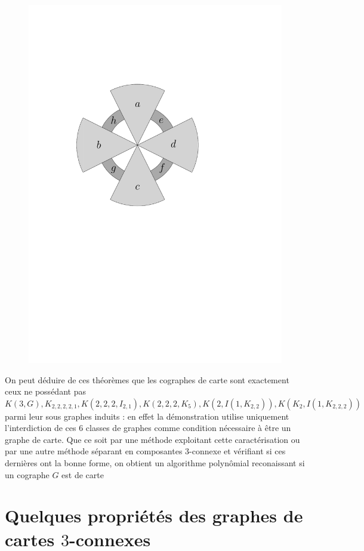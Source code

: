 \documentclass{scrartcl}
\begin{document}
\begin{flushleft}
\begin{figure}[h]
\begin{center}
        \includegraphics[page = \ipeFigcographsepind, scale = 0.6]{figs}
    \end{center}
\end{figure}

On peut déduire de ces théorèmes que les cographes de carte sont exactement ceux ne possédant pas $K(3, G), K_{2,2,2,2,1},
K(2,2,2,I_{2,1}), K(2,2,2,K_5), K(2, I(1, K_{2,2})), K(K_2, I(1, K_{2,2,2}))$
parmi leur sous graphes induits : en effet la démonstration utilise uniquement l'interdiction de ces $6$ classes de graphes comme condition nécessaire
à être un graphe de carte. Que ce soit par une méthode exploitant cette caractérisation ou par une autre méthode séparant en composantes
$3$-connexe et vérifiant si ces dernières ont la bonne forme, on obtient un algorithme polynômial reconaissant si un cographe $G$ est de carte

\section{Quelques propriétés des graphes de cartes $3$-connexes}


\end{flushleft}
\end{document}
